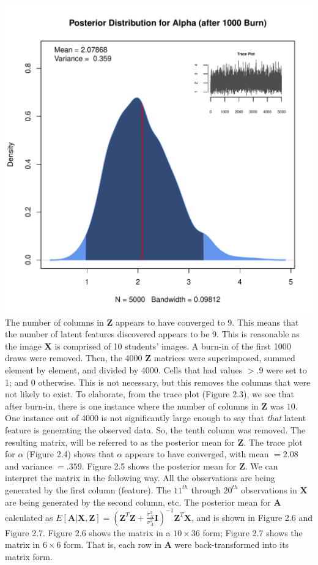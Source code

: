   \includegraphics{images/postAlpha.pdf}
  \vspace{-10mm}
\endmyfig
\noindent
The number of columns in $\bm Z$ appears to have converged to 9. This means
that the number of latent features discovered appears to be 9. This is
reasonable as the image $\bm X$ is comprised of 10 students' images. A burn-in
of the first 1000 draws were removed. Then, the 4000 $\bm Z$ matrices were
superimposed, summed element by element, and divided by 4000. Cells that had
values $> .9$ were set to 1; and 0 otherwise. This is not necessary, but this
removes the columns that were not likely to exist. To elaborate, from the trace
plot (Figure 2.3), we see that after burn-in, there is one instance where the
number of columns in $\bm Z$ was $10$.  One instance out of 4000 is not
significantly large enough to say that \textit{that} latent feature is 
generating the observed data. So, the tenth column was removed. The resulting
matrix, will be referred to as the posterior mean for $\bm Z$. The trace plot for
$\alpha$ (Figure 2.4) shows that $\alpha$ appears to have converged, with mean
$=2.08$ and variance $=.359$.  Figure 2.5 shows the posterior mean for $\bm Z$.
We can interpret the matrix in the following way. All the observations are 
being generated by the first column (feature). The $11^{th}$ through $20^{th}$
observations in $\bm X$ are being generated by the second column, etc.
The posterior mean for $\bm A$ calculated as $E[\bm{A|X,Z}] = (\bm Z^T\bm Z +
\frac{\sigma_X^2}{\sigma_A^2} \textbf{I})^{-1}\bm Z^T \bm X$, and is shown
in Figure 2.6 and Figure 2.7. Figure 2.6 shows the matrix in a $10 \times 36$ form;
Figure 2.7 shows the matrix in $6 \times 6$ form. That is, each row in $\bm A$
were back-transformed into its matrix form.\\

